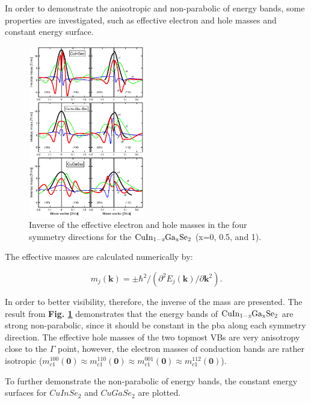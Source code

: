 \documentclass[a4paper, 12pt, titlepage,oneside,drop]{kthesis}
\begin{document}
In order to demonstrate the anisotropic and non-parabolic of energy bands, some properties are investigated, such as effective 
electron and hole masses and constant energy surface.

\begin{figure}[H]
    \begin{center}
            \includegraphics[width=0.45\textwidth,clip]{paper1figure3}
     \end{center}
    \caption{ Inverse of the effective electron and hole masses in the four symmetry directions for the $\mathrm { CuIn_{1-\textit{x}}Ga_{x}Se_2}$ (x=0, 0.5, and 1).}      
    \label{inversemessf}
\end{figure}

The effective masses are calculated numerically by:

\begin{equation}\label{inversemasse}
m_j(\textbf{k}) = \pm \hbar^2/(\partial^2 E_j(\textbf{k})/\partial\textbf{k}^2).
\end{equation}
 
In order to better visibility, therefore, the inverse of the mass are presented. The result from \textbf{Fig. \ref{inversemessf}} demonstrates that the energy bands of $\mathrm { CuIn_{1-\textit{x}}Ga_{x}Se_2}$
are strong non-parabolic, since it should be constant in the pba along each symmetry direction. The effective hole masses of the two topmost VBs are very anisotropy close
to the $\Gamma$ point, however, the electron masses of conduction bands are rather isotropic ($m_{c1}^{100}(\textbf{0}) \approx m_{c1}^{110}(\textbf{0}) \approx m_{c1}^{001}(\textbf{0}) \approx m_{c1}^{112}(\textbf{0})$).

To further demonstrate the non-parabolic of energy bands, the constant energy surfaces for $CuInSe_2$ and $CuGaSe_2$ are plotted.
\end{document}
